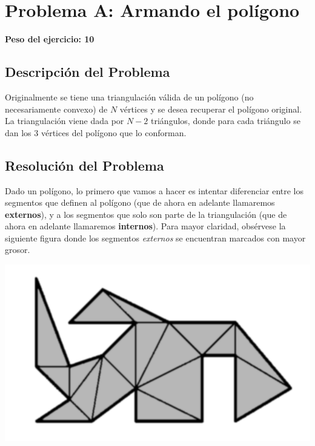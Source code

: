 \newpage{}
\section{Problema A: Armando el polígono}
\textbf{Peso del ejercicio: 10}

\subsection{Descripción del Problema}

Originalmente se tiene una triangulación válida de un polígono (no necesariamente convexo) de $N$ vértices  y se desea recuperar el polígono original. La triangulación viene dada por $N-2$ triángulos, donde para cada triángulo se dan los $3$ vértices del polígono que lo conforman.

\subsection{Resolución del Problema}

Dado un polígono, lo primero que vamos a hacer es intentar diferenciar entre los segmentos que definen al polígono (que de ahora en adelante llamaremos \textbf{externos}), y a los segmentos que solo son parte de la triangulación (que de ahora en adelante llamaremos \textbf{internos}). Para mayor claridad, obsérvese la siguiente figura donde los segmentos \textit{externos} se encuentran marcados con mayor grosor.

\begin{center}
	\includegraphics[scale=0.2]{triangulacion.png}
\end{center}


